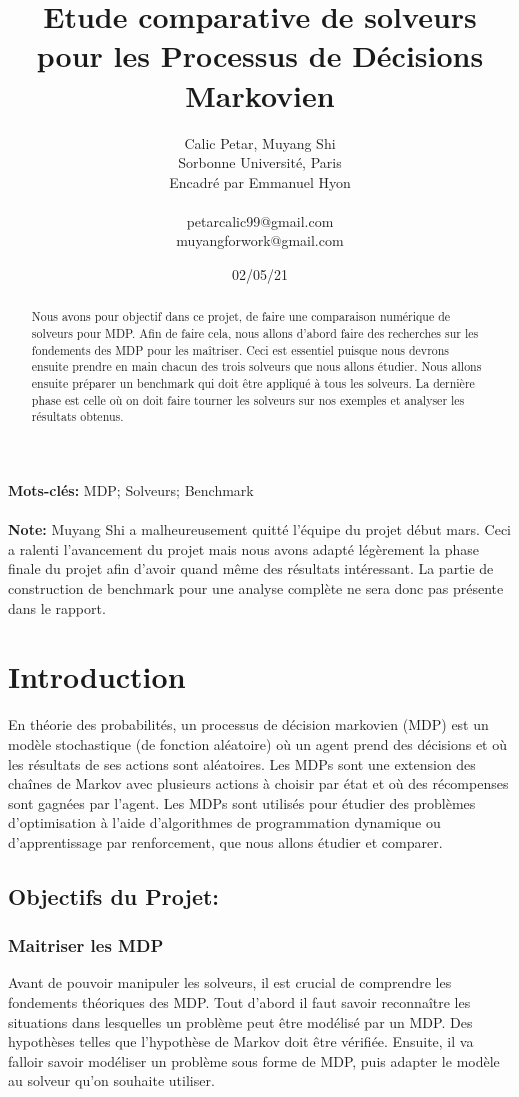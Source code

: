 \documentclass{article}
\title{Etude comparative de solveurs pour les Processus de Décisions Markovien}
\author{Calic Petar, Muyang Shi \\
         Sorbonne Université, Paris \\
         Encadré par Emmanuel Hyon \\ \\
        \small petarcalic99@gmail.com\\
        \small muyangforwork@gmail.com\\
}
\date{02/05/21} %
\begin{document}
\maketitle

\begin{abstract} 
\noindent Nous avons pour objectif dans ce projet, de faire une comparaison numérique de solveurs pour MDP. Afin de faire cela, nous allons d'abord faire des recherches sur les fondements des MDP pour les maîtriser. Ceci est essentiel puisque nous devrons ensuite prendre en main chacun des trois solveurs que nous allons étudier. Nous allons ensuite préparer un benchmark qui doit être appliqué à tous les solveurs. La dernière phase est celle où on doit faire tourner les solveurs sur nos exemples et analyser les résultats obtenus. \end{abstract}

\noindent\textbf{Mots-clés:} MDP; Solveurs; Benchmark\\\\
\noindent\textbf{Note:} Muyang Shi a malheureusement quitté l'équipe du projet début mars. Ceci a ralenti l'avancement du projet mais nous avons adapté légèrement la phase finale du projet afin d'avoir quand même des résultats intéressant. La partie de construction de benchmark pour une analyse complète ne sera donc pas présente dans le rapport. \\



\section{Introduction}

\noindent En théorie des probabilités, un processus de décision markovien (MDP) est un modèle stochastique (de fonction aléatoire) où un agent prend des décisions et où les résultats de ses actions sont aléatoires. Les MDPs sont une extension des chaînes de Markov avec plusieurs actions à choisir par état et où des récompenses sont gagnées par l'agent. Les MDPs sont utilisés pour étudier des problèmes d'optimisation à l'aide d'algorithmes de programmation dynamique ou d'apprentissage par renforcement, que nous allons étudier et comparer.

\subsection{Objectifs du Projet:}
\subsubsection{Maitriser les MDP}
Avant de pouvoir manipuler les solveurs, il est crucial de comprendre les fondements théoriques des MDP. Tout d'abord il faut savoir reconnaître les situations dans lesquelles un problème peut être modélisé par un MDP. Des hypothèses telles que l'hypothèse de Markov doit être vérifiée. Ensuite, il va falloir savoir modéliser un problème sous forme de MDP, puis adapter le modèle au solveur qu'on souhaite utiliser.
\end{document}
